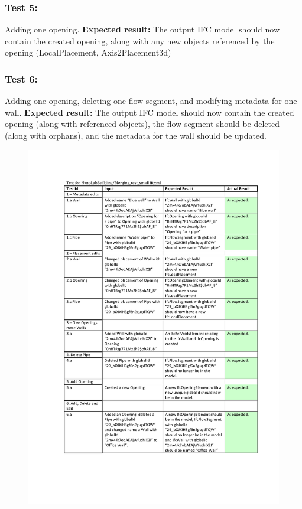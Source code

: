 \subsubsection{Test 5:}
Adding one opening.
\textbf{Expected result:} The output IFC model should now contain the created opening, along with any new objects referenced by the opening (LocalPlacement, Axis2Placement3d)
\subsubsection{Test 6:}
Adding one opening, deleting one flow segment, and modifying metadata for one wall.
\textbf{Expected result:} The output IFC model should now contain the created opening (along with referenced objects), the flow segment should be deleted (along with orphans), and the metadata for the wall should be updated.
\begin{figure}[ht]
    \centering
        \centerline{\includegraphics[width=150mm]{images/Test1.pdf}}
    \caption{}
    \label{fig:test1}
\end{figure}
